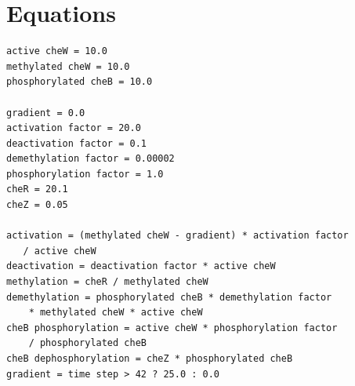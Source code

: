 \documentclass[12pt]{article}
\begin{document}
\section{Equations}

\begin{verbatim}
active cheW = 10.0
methylated cheW = 10.0
phosphorylated cheB = 10.0

gradient = 0.0
activation factor = 20.0
deactivation factor = 0.1
demethylation factor = 0.00002
phosphorylation factor = 1.0
cheR = 20.1
cheZ = 0.05

activation = (methylated cheW - gradient) * activation factor 
   / active cheW
deactivation = deactivation factor * active cheW 
methylation = cheR / methylated cheW 
demethylation = phosphorylated cheB * demethylation factor 
    * methylated cheW * active cheW 
cheB phosphorylation = active cheW * phosphorylation factor 
    / phosphorylated cheB 
cheB dephosphorylation = cheZ * phosphorylated cheB 
gradient = time step > 42 ? 25.0 : 0.0 
\end{verbatim}



\end{document}
